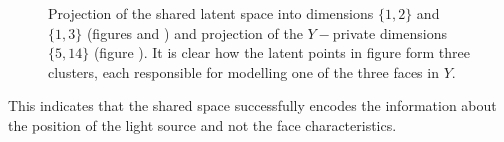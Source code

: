 \begin{figure}[ht]
\begin{center}
\hspace{-5pt}
\hspace{-5pt}
\end{center}
\vspace{-4pt}
\caption{
Projection of the shared latent space into dimensions $\{1,2\}$ and $\{1,3\}$ (figures
 and ) and projection of the $Y-$private dimensions $\{5,14\}$
(figure ).
 It is clear how the latent points in figure
 form three clusters, each responsible for modelling one of the three faces in $Y$.
}
\label{fig:yale6SetsLatentSpace}
\end{figure}
%
%
This indicates that the shared space successfully encodes the
information about the position of the light source and not the face
characteristics.
